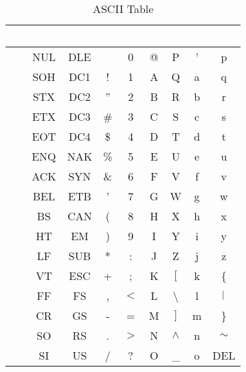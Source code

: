 \begin{table}[H]
  \sffamily
  \newcommand{\head}[1]{\textcolor{white}{\textbf{#1}}}    
  \begin{center}
    \begin{tabular}{ c c c c c c c c c } 
      \hline
      \rowcolor{black!75}
      & {\head{0}} & {\head{1}} & {\head{2}} & {\head{3}}
      & {\head{4}} & {\head{5}} & {\head{6}} & {\head{7}} \\
      \hline  
      \cellcolor{black!75}\head{0} & {NUL} & {DLE} & {} & {0} & {@} & 
      {P} & {'} & {p} 
      \\
      \cellcolor{black!75}\head{1} & {SOH} & {DC1} & {!} & {1} & {A} & 
      {Q} & {a} & {q} 
      \\
      \cellcolor{black!75}\head{2} & {STX} & {DC2} & {''} & {2} & {B} & 
      {R} & {b} & {r} 
      \\
      \cellcolor{black!75}\head{3} & {ETX} & {DC3} & {\#} & {3} & {C} & 
      {S} & {c} & {s} 
      \\
      \cellcolor{black!75}\head{4} & {EOT} & {DC4} & {\$} & {4} & {D} & 
      {T} & {d} & {t} 
      \\
      \cellcolor{black!75}\head{5} & {ENQ} & {NAK} & {\%} & {5} & {E} & 
      {U} & {e} & {u} 
      \\
      \cellcolor{black!75}\head{6} & {ACK} & {SYN} & {\&} & {6} & {F} & 
      {V} & {f} & {v} 
      \\
      \cellcolor{black!75}\head{7} & {BEL} & {ETB} & {'} & {7} & {G} & 
      {W} & {g} & {w} 
      \\
      \cellcolor{black!75}\head{8} & {BS} & {CAN} & {(} & {8} & {H} & 
      {X} & {h} & {x}
      \\
      \cellcolor{black!75}\head{9} & {HT} & {EM} & {)} & {9} & {I} & 
      {Y} & {i} & {y} 
      \\
      \cellcolor{black!75}\head{A} & {LF} & {SUB} & {*} & {:} & {J} & 
      {Z} & {j} & {z} 
      \\
      \cellcolor{black!75}\head{B} & {VT} & {ESC} & {+} & {;} & {K} & 
      $ [ $ & {k} & \{ 
      \\
      \cellcolor{black!75}\head{C} & {FF} & {FS} & {,} & $ < $ & {L} & 
      \textbackslash & {l} & {$ \arrowvert $} 
      \\
      \cellcolor{black!75}\head{D} & {CR} & {GS} & {-} & {=} & {M} & 
      $ ] $ & {m} & {\}} 
      \\
      \cellcolor{black!75}\head{E} & {SO} & {RS} & {.} & $ > $ & {N} & 
      $ \wedge $ & {n} & $ \sim $ 
      \\
      \cellcolor{black!75}\head{F} & {SI} & {US} & {/} & {?} & {O} & 
      {\_} & {o} & {DEL}       
      \\
      \hline
    \end{tabular}
  \end{center}
  \caption{ASCII Table}
  \label{MO:tab:ascii_table}
\end{table}

